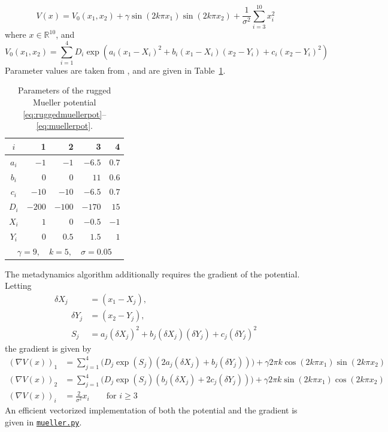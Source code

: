 \documentclass[12pt]{article}
\newcommand{\R}{{\mathbb{R}}}
\theoremstyle{ColorTheorem}
\numberwithin{theorem}{section}
\numberwithin{corollary}{section}
\theoremstyle{ColorDefinition}
\theoremstyle{definition}
\theoremstyle{ColorRemark}
\numberwithin{equation}{section}
\begin{document}
\begin{equation}\label{eq:ruggedmuellerpot}
  V(x) = V_0(x_1, x_2) + \gamma \sin(2 k \pi x_1) \sin(2 k \pi x_2) + \frac{1}{\sigma^2} \sum_{i=3}^{10} x_i^2
\end{equation}
where \(x \in \R^{10}\), and 
\begin{equation}\label{eq:muellerpot}
  V_0(x_1, x_2)  = \sum_{i=1}^4 D_i \exp\left(a_i (x_1 - X_i)^2 + b_i (x_1 - X_i)(x_2-Y_i) + c_i (x_2 - Y_i)^2\right)
\end{equation}
Parameter values are taken from \cite{yuan2024}, and are given in Table~\ref{tab:muellerparams}.
\begin{table}[htbp]
  \centering
  \caption{Parameters of the rugged Mueller potential \eqref{eq:ruggedmuellerpot}--\eqref{eq:muellerpot}.}
  \label{tab:muellerparams}
  \begin{tabular}{c|rrrr}
    \(i\) & 1 & 2 & 3 & 4 \\
    \hline
    \(a_i\) & \(-1\)   & \(-1\)   & \(-6.5\) & \(0.7\) \\
    \(b_i\) & \(0\)    & \(0\)    & \(11\)   & \(0.6\) \\
    \(c_i\) & \(-10\)  & \(-10\)  & \(-6.5\) & \(0.7\) \\
    \(D_i\) & \(-200\) & \(-100\) & \(-170\) & \(15\)  \\
    \(X_i\) & \(1\)    & \(0\)    & \(-0.5\) & \(-1\)  \\
    \(Y_i\) & \(0\)    & \(0.5\)  & \(1.5\)  & \(1\)   \\
    \hline
    \multicolumn{5}{c}{\(\gamma = 9, \quad k = 5, \quad \sigma = 0.05\)}
  \end{tabular}
\end{table}
The metadynamics algorithm additionally requires the gradient of the potential.
Letting 
\begin{equation}
  \begin{aligned}
    \delta X_j &= (x_1 - X_j), \\
    \qquad \delta Y_j &= (x_2 - Y_j),\\
    \qquad S_j &= a_j (\delta X_j)^2 + b_j (\delta X_j)(\delta Y_j) + c_j(\delta Y_j)^2
  \end{aligned}
\end{equation}
the gradient is given by
\begin{equation}\label{eq:grad_mueller_potential}
  \begin{aligned}
    (\nabla V(x))_1 &= 
      \sum_{j=1}^4 \Big( D_j \exp(S_j) \left(2 a_j (\delta X_j) + b_j (\delta Y_j)\right) \Big)
      + \gamma 2 \pi k \cos(2k \pi x_1) \sin(2 k \pi x_2)\\
    (\nabla V(x))_2 &= 
      \sum_{j=1}^4 \Big( D_j \exp(S_j) \left(b_j (\delta X_j) + 2 c_j (\delta Y_j)\right) \Big)
      + \gamma 2 \pi k \sin(2k \pi x_1) \cos(2 k \pi x_2)\\
    (\nabla V(x))_i &= \frac{2}{\sigma^2} x_i \qquad \text{for } i \ge 3
  \end{aligned}
\end{equation}
An efficient vectorized implementation of both the potential and the gradient is given in
\href{https://github.com/jrippeon/amsc665project2/blob/main/src/committor/mueller.py}{\texttt{mueller.py}}.
\end{document}
